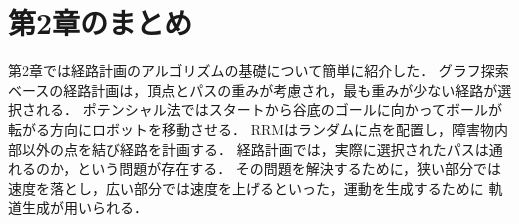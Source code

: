 
\section{第2章のまとめ}

第2章では経路計画のアルゴリズムの基礎について簡単に紹介した．
グラフ探索ベースの経路計画は，頂点とパスの重みが考慮され，最も重みが少ない経路が選択される．
ポテンシャル法ではスタートから谷底のゴールに向かってボールが転がる方向にロボットを移動させる．
RRMはランダムに点を配置し，障害物内部以外の点を結び経路を計画する．
経路計画では，実際に選択されたパスは通れるのか，という問題が存在する．
その問題を解決するために，狭い部分では速度を落とし，広い部分では速度を上げるといった，運動を生成するために
軌道生成が用いられる．
\newpage
